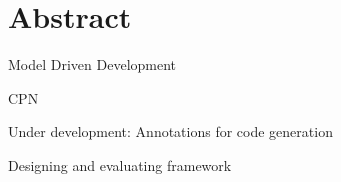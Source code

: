 \chapter*{Abstract}

Model Driven Development

CPN

Under development: Annotations for code generation

Designing and evaluating framework

